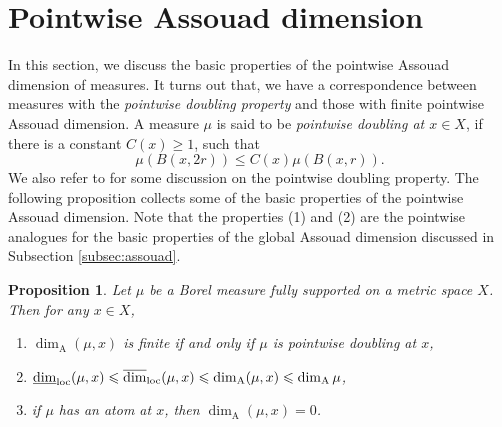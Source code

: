 \documentclass{PRM}
\newcommand{\updim}{\overline{\dim}}
\newcommand{\lowdim}{\underline{\dim}}
\newcommand{\adim}{\dim_{\mathrm{A}}}
\theoremstyle{plain}
\newtheorem{prop}[thm]{Proposition}
\theoremstyle{definition}
\theoremstyle{remark}
\begin{document}
\section{Pointwise Assouad dimension}\label{sec:pw_assouad}
In this section, we discuss the basic properties of the pointwise Assouad dimension of measures. It turns out that, we have a correspondence between measures with the \emph{pointwise doubling property} and those with finite pointwise Assouad dimension. A measure $\mu$ is said to be \emph{pointwise doubling at $x\in X$}, if there is a constant $C(x)\geq 1$, such that
\begin{equation*}
    \mu(B(x,2r))\leq C(x)\mu(B(x,r)).
\end{equation*}
We also refer to \cite{BBL} for some discussion on the pointwise doubling property.
The following proposition collects some of the basic properties of the pointwise Assouad dimension. Note that the properties (1) and (2) are the pointwise analogues for the basic properties of the global Assouad dimension discussed in Subsection \ref{subsec:assouad}.
\begin{prop}\label{prop:basic_properties}
Let $\mu$ be a Borel measure fully supported on a metric space $X$. Then for any $x\in X$,
\begin{enumerate}
    \item[(1)] $\dim_{\mathrm{A}}(\mu,x)$ is finite if and only if $\mu$ is pointwise doubling at $x$,
    \item[(2)] $\lowdim_{\textnormal{loc}}(\mu,x)\leq\updim_{\textnormal{loc}}(\mu,x)\leq \dim_{\mathrm{A}}(\mu,x)\leq \adim\mu$,
    \item[(3)] if $\mu$ has an atom at $x$, then $\dim_{\mathrm{A}}(\mu,x)=0$.
\end{enumerate}
\end{prop}
\end{document}
